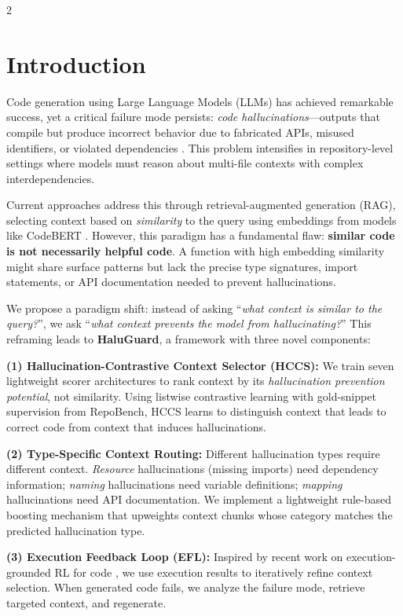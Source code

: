 \documentclass[11pt,a4paper]{article}
\begin{document}
\begin{multicols}{2}

\section{Introduction}

Code generation using Large Language Models (LLMs) has achieved remarkable success, yet a critical failure mode persists: \textit{code hallucinations}---outputs that compile but produce incorrect behavior due to fabricated APIs, misused identifiers, or violated dependencies \citep{tian2025codehalu}. This problem intensifies in repository-level settings where models must reason about multi-file contexts with complex interdependencies.

Current approaches address this through retrieval-augmented generation (RAG), selecting context based on \textit{similarity} to the query using embeddings from models like CodeBERT \citep{liu2024graphcoder, phan2024repohyper}. However, this paradigm has a fundamental flaw: \textbf{similar code is not necessarily helpful code}. A function with high embedding similarity might share surface patterns but lack the precise type signatures, import statements, or API documentation needed to prevent hallucinations.

We propose a paradigm shift: instead of asking ``\textit{what context is similar to the query?}'', we ask ``\textit{what context prevents the model from hallucinating?}'' This reframing leads to \textbf{HaluGuard}, a framework with three novel components:

\textbf{(1) Hallucination-Contrastive Context Selector (HCCS):} We train seven lightweight scorer architectures to rank context by its \textit{hallucination prevention potential}, not similarity. Using listwise contrastive learning with gold-snippet supervision from RepoBench, HCCS learns to distinguish context that leads to correct code from context that induces hallucinations.

\textbf{(2) Type-Specific Context Routing:} Different hallucination types require different context. \textit{Resource} hallucinations (missing imports) need dependency information; \textit{naming} hallucinations need variable definitions; \textit{mapping} hallucinations need API documentation. We implement a lightweight rule-based boosting mechanism that upweights context chunks whose category matches the predicted hallucination type.

\textbf{(3) Execution Feedback Loop (EFL):} Inspired by recent work on execution-grounded RL for code \citep{gehring2024rlef}, we use execution results to iteratively refine context selection. When generated code fails, we analyze the failure mode, retrieve targeted context, and regenerate.


\end{multicols}
\end{document}

